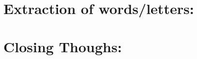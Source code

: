 \documentclass[twoside,a4paper]{article}
\begin{document}
\section{Extraction of words/letters: }
\section{Closing Thoughs: }
\printbibliography
\end{document}
